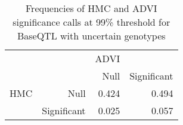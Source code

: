 \begin{table}[ht]
\centering
\caption{Frequencies of HMC and ADVI significance calls at 99\% threshold for BaseQTL with uncertain genotypes} 
\label{tab:noGT-xtab-prop-99}
\begin{tabular}{rr|rr}
   &  & ADVI &  \\ 
    &   & Null & Significant \\ 
   \hline
HMC & Null & 0.424 & 0.494 \\ 
    & Significant & 0.025 & 0.057 \\ 
  \end{tabular}
\end{table}
